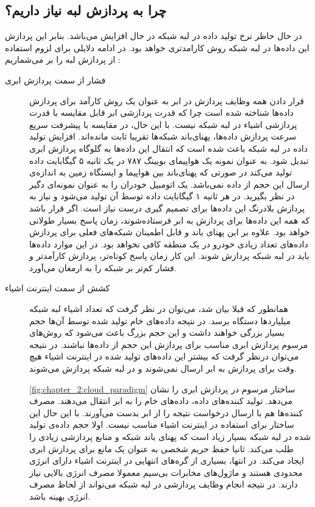     \subsection{چرا به پردازش لبه نیاز داریم؟}
      در حال حاظر نرخ تولید داده در لبه شبکه در حال افزایش می‌باشد.
      بنابر این پردازش این داده‌ها در لبه شبکه روش کارامدتری خواهد بود.
      در ادامه دلایلی برای لزوم استفاده از پردازش لبه را بر می‌شماریم \cite{shi2016edge}:
      \begin{description}
        \item [فشار از سمت پردازش ابری]
          قرار دادن همه وظایف پردازش در ابر به عنوان یک روش کارآمد برای پردازش داده‌ها شناخته شده است چرا که قدرت پردازشی ابر قابل مقایسه با قدرت پردازشی اشیاء در لبه شبکه نیست.
          با این حال، در مقایسه با پیشرفت سریع سرعت پردازش داده‌ها، پهنای‌باند شبکه‌ها تقریبا ثابت مانده‌اند.
          افزایش تولید داده در لبه شبکه باعث شده است که انتقال این داده‌ها به گلوگاه پردازش ابری تبدیل شود.
          به عنوان نمونه یک هواپیما‌ی بویینگ ۷۸۷ در یک ثانیه ۵ گیگابایت داده تولید می‌کند در صورتی که پهنای‌باند بین هواپیما و ایستگاه زمین به اندازه‌ی ارسال این حجم از داده نمی‌باشد.
          یک اتومبیل خودران را به عنوان نمونه‌ای دگیر در نظر بگیرید.
          در هر ثانیه ۱ گیگابایت داده توسط آن تولید می‌شود و نیاز به پردازش بلادرنگ این داده‌ها برای تصمیم گیری درست نیاز است.
          اگر قرار باشد که همه این داده‌ها برای پردازش به ابر فرستاده‌شوند، زمان پاسخ بسیار طولانی خواهد بود.
          علاوه بر این پهنای باند و قابل اطمینان شبکه‌های فعلی برای پردازش داده‌‌های تعداد زیادی خودرو در یک منطقه کافی نخواهد بود.
          در این موارد داده‌ها باید در لبه شبکه پردازش شوند.
          این کار زمان پاسخ کوتاه‌تر، پردازش کارآمد‌تر و فشار کم‌تر بر شبکه را به ارمغان می‌آورد.

        \item [کشش از سمت اینترنت اشیاء]
          همانطور که قبلا بیان شد، می‌توان در نظر گرفت که تعداد اشیاء لبه شبکه میلیارد‌ها دستگاه برسد.
          در نتیجه داده‌های خام تولید شده توسط آن‌ها حجم بسیار بزرگی خواهند داشت و این حجم بزرگ باعث می‌شود که روش‌های مرسوم پردازش ابری مناسب برای پردازش این حجم از داده‌ها نباشند.
          در نتیجه می‌توان درنظر گرفت که بیشتر این داده‌های تولید شده در اینترنت اشیاء هیچ وقت برای پردازش به ابر ارسال نمی‌شوند و در لبه شبکه پردازش می‌شوند.

          \cref{fig:chapter_2:cloud_paradigm} ساختار مرسوم در پردازش ابری را نشان می‌دهد.
          تولید کننده‌های داده، داده‌های خام را به ابر انتقال می‌دهند.
          مصرف کننده‌ها هم با ارسال درخواست نتیجه را از ابر بدست می‌آورند.
          با این حال این ساختار برای استفاده در اینترنت اشیاء مناسب نیست.
          اولا حجم داده‌ی تولید شده در لبه شبکه بسیار زیاد است که پهنای باند شبکه و منابع پردازشی زیادی را طلب می‌کند.
          ثانیا حفظ حریم شخصی به عنوان یک مانع برای پردازش ابری ایجاد می‌کند.
          در انتها، بسیاری از گره‌های انتهایی در اینترنت اشیاء دارای انرژی محدودی هستند و ماژول‌های مخابرات بی‌سیم معمولا مصرف انرژی بالایی نیاز دارند.
          در نتیجه انجام وظایف پردازشی در لبه شبکه می‌تواند از لحاظ مصرف انرژی بهینه‌ باشد.


\end{description}
